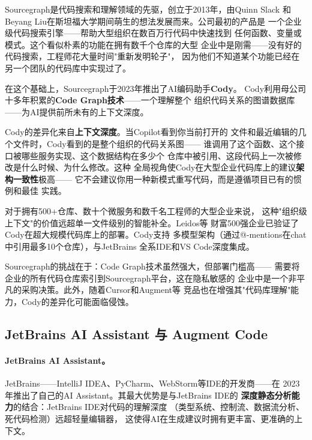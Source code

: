 Sourcegraph是代码搜索和理解领域的先驱，创立于2013年，由Quinn Slack
和Beyang Liu在斯坦福大学期间萌生的想法发展而来。公司最初的产品是
一个企业级代码搜索引擎——帮助大型组织在数百万行代码中快速找到
任何函数、变量或模式。这个看似朴素的功能在拥有数千个仓库的大型
企业中是刚需——没有好的代码搜索，工程师花大量时间"重新发明轮子"，
因为他们不知道某个功能已经在另一个团队的代码库中实现过了。

在这个基础上，Sourcegraph于2023年推出了AI编码助手\textbf{Cody}。
Cody利用母公司十多年积累的\textbf{Code Graph技术}——一个理解整个
组织代码关系的图谱数据库——为AI提供前所未有的上下文深度。

Cody的差异化来自\textbf{上下文深度}。当Copilot看到你当前打开的
文件和最近编辑的几个文件时，Cody看到的是整个组织的代码关系图——
谁调用了这个函数、这个接口被哪些服务实现、这个数据结构在多少个
仓库中被引用、这段代码上一次被修改是什么时候、为什么修改。这种
全局视角使Cody在大型企业代码库上的建议\textbf{架构一致性}极高——
它不会建议你用一种新模式重写代码，而是遵循项目已有的惯例和最佳
实践。

对于拥有500+仓库、数十个微服务和数千名工程师的大型企业来说，
这种"组织级上下文"的价值远超单一文件级别的智能补全。Leidos等
财富500强企业已验证了Cody在超大规模代码库上的部署。Cody支持
多模型架构（通过@-mentions在chat中引用最多10个仓库），与JetBrains
全系IDE和VS Code深度集成。

Sourcegraph的挑战在于：Code Graph技术虽然强大，但部署门槛高——
需要将企业的所有代码仓库索引到Sourcegraph平台，这在隐私敏感的
企业中是一个非平凡的采购决策。此外，随着Cursor和Augment等
竞品也在增强其"代码库理解"能力，Cody的差异化可能面临侵蚀。

\subsection{JetBrains AI Assistant 与 Augment Code}
\label{subsec:jetbrains-augment}

\paragraph{JetBrains AI Assistant。}
JetBrains——IntelliJ IDEA、PyCharm、WebStorm等IDE的开发商——在
2023年推出了自己的AI Assistant。其最大优势是与JetBrains IDE的
\textbf{深度静态分析能力}的结合：JetBrains IDE对代码的理解深度
（类型系统、控制流、数据流分析、死代码检测）远超轻量编辑器，
这使得AI在生成建议时拥有更丰富、更准确的上下文。

